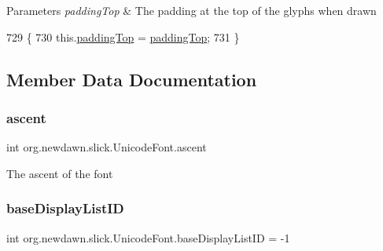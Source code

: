 \begin{DoxyParams}{Parameters}
{\em padding\+Top} & The padding at the top of the glyphs when drawn \\
\hline
\end{DoxyParams}

\begin{DoxyCode}
729                                               \{
730         this.\mbox{\hyperlink{classorg_1_1newdawn_1_1slick_1_1_unicode_font_acadcc8c595615d077e2c0039818292f2}{paddingTop}} = \mbox{\hyperlink{classorg_1_1newdawn_1_1slick_1_1_unicode_font_acadcc8c595615d077e2c0039818292f2}{paddingTop}};
731     \}
\end{DoxyCode}


\subsection{Member Data Documentation}
\mbox{\label{classorg_1_1newdawn_1_1slick_1_1_unicode_font_a195706fa1491e793a4b923dd844b594f}} 
\subsubsection{\texorpdfstring{ascent}{ascent}}
{\footnotesize\ttfamily int org.\+newdawn.\+slick.\+Unicode\+Font.\+ascent\hspace{0.3cm}{\ttfamily [private]}}

The ascent of the font \mbox{\label{classorg_1_1newdawn_1_1slick_1_1_unicode_font_ad3264c179ec09ec85ddd79e09a2d7e89}} 
\subsubsection{\texorpdfstring{base\+Display\+List\+ID}{baseDisplayListID}}
{\footnotesize\ttfamily int org.\+newdawn.\+slick.\+Unicode\+Font.\+base\+Display\+List\+ID = -\/1\hspace{0.3cm}{\ttfamily [private]}}

